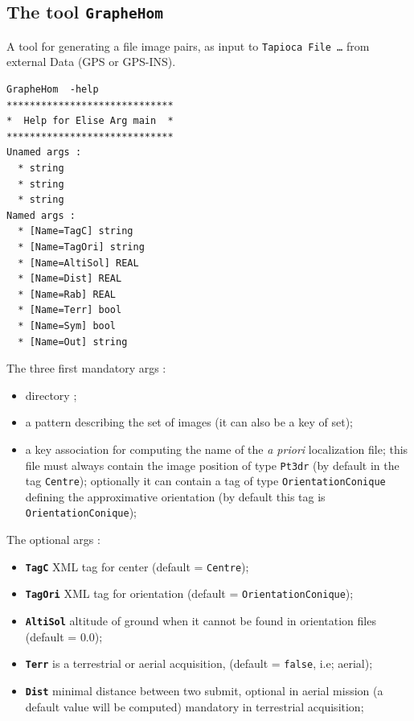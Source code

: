 \subsection{The tool {\tt GrapheHom}}

A tool for generating a file image pairs, as input to {\tt Tapioca File \dots } from external Data (GPS or GPS-INS).

\begin{verbatim}
GrapheHom  -help
*****************************
*  Help for Elise Arg main  *
*****************************
Unamed args : 
  * string
  * string
  * string
Named args : 
  * [Name=TagC] string
  * [Name=TagOri] string
  * [Name=AltiSol] REAL
  * [Name=Dist] REAL
  * [Name=Rab] REAL
  * [Name=Terr] bool
  * [Name=Sym] bool
  * [Name=Out] string

\end{verbatim}

The three first mandatory args :

\begin{itemize}
   \item directory ;

   \item a pattern describing the set of images (it can also be a key of set);

   \item a key association for computing the name of the \emph{a priori }localization file;
         this file must always contain the image position of type {\tt Pt3dr}
         (by default in the tag {\tt Centre});
         optionally it can contain a tag of type {\tt OrientationConique}  defining
         the approximative orientation (by default this tag is  {\tt OrientationConique});
\end{itemize}


The optional args :

\begin{itemize}
    \item {\tt \bf TagC} XML tag for center (default = {\tt Centre});
    \item {\tt \bf TagOri} XML tag for orientation (default = {\tt OrientationConique});
    \item {\tt \bf AltiSol}  altitude of ground when it cannot be found in orientation files
           (default = $0.0$);
    \item {\tt \bf Terr}   is a terrestrial or aerial acquisition, (default = {\tt false}, i.e; aerial);
    \item {\tt \bf Dist}  minimal distance between two submit, optional in aerial mission
          (a default value will be computed) mandatory in terrestrial acquisition;
\end{itemize}


